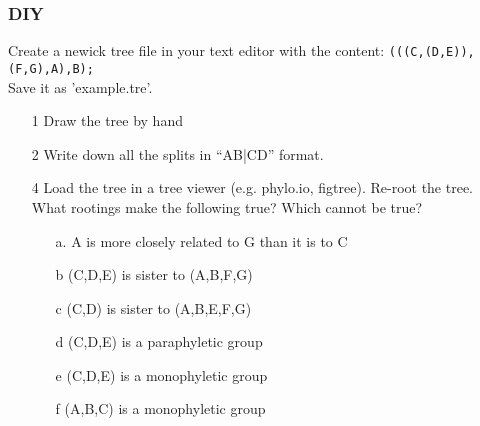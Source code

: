 \documentclass{beamer}
\begin{document}
\begin{frame}
\frametitle{DIY}
Create a newick tree file in your text editor with the content:
\texttt{(((C,(D,E)),(F,G),A),B);}\\
Save it as 'example.tre'.\\
\begin{itemize}
 \item[1] Draw the tree by hand
 \item[2] Write down all the splits in ``AB|CD'' format.
 \item[4] Load the tree in a tree viewer (e.g. phylo.io, figtree). Re-root  the tree. What rootings make the following true? Which cannot be true?
 \begin{itemize}
 \item[a.] A is more closely related to G than it is to C
 \item[b] (C,D,E) is sister to (A,B,F,G)
 \item[c] (C,D) is sister to (A,B,E,F,G)
 \item[d] (C,D,E) is a paraphyletic group
 \item[e] (C,D,E) is a monophyletic group
 \item[f] (A,B,C) is a monophyletic group
 \end{itemize}
\end{itemize}
\end{frame}
\end{document}
